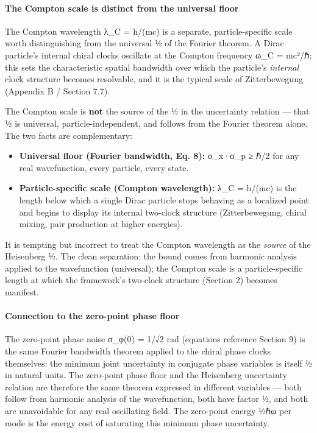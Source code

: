 \documentclass[
]{article}
\providecommand{\tightlist}{%
  \setlength{\itemsep}{0pt}\setlength{\parskip}{0pt}}
\begin{document}
\paragraph{The Compton scale is distinct from the universal
floor}\label{the-compton-scale-is-distinct-from-the-universal-floor}

The Compton wavelength λ\_C = h/(mc) is a separate, particle-specific
scale worth distinguishing from the universal ½ of the Fourier theorem.
A Dirac particle's internal chiral clocks oscillate at the Compton
frequency ω\_C = mc²/ℏ; this sets the characteristic spatial bandwidth
over which the particle's \emph{internal} clock structure becomes
resolvable, and it is the typical scale of Zitterbewegung (Appendix B /
Section 7.7).

The Compton scale is \textbf{not} the source of the ½ in the uncertainty
relation --- that ½ is universal, particle-independent, and follows from
the Fourier theorem alone. The two facts are complementary:

\begin{itemize}
\tightlist
\item
  \textbf{Universal floor (Fourier bandwidth, Eq. 8):} σ\_x·σ\_p ≥ ℏ/2
  for any real wavefunction, every particle, every state.
\item
  \textbf{Particle-specific scale (Compton wavelength):} λ\_C = h/(mc)
  is the length below which a single Dirac particle stops behaving as a
  localized point and begins to display its internal two-clock structure
  (Zitterbewegung, chiral mixing, pair production at higher energies).
\end{itemize}

It is tempting but incorrect to treat the Compton wavelength as the
\emph{source} of the Heisenberg ½. The clean separation: the bound comes
from harmonic analysis applied to the wavefunction (universal); the
Compton scale is a particle-specific length at which the framework's
two-clock structure (Section 2) becomes manifest.

\paragraph{Connection to the zero-point phase
floor}\label{connection-to-the-zero-point-phase-floor}

The zero-point phase noise σ\_φ(0) = 1/√2 rad (equations reference
Section 9) is the same Fourier bandwidth theorem applied to the chiral
phase clocks themselves: the minimum joint uncertainty in conjugate
phase variables is itself ½ in natural units. The zero-point phase floor
and the Heisenberg uncertainty relation are therefore the same theorem
expressed in different variables --- both follow from harmonic analysis
of the wavefunction, both have factor ½, and both are unavoidable for
any real oscillating field. The zero-point energy ½ℏω per mode is the
energy cost of saturating this minimum phase uncertainty.
\end{document}
